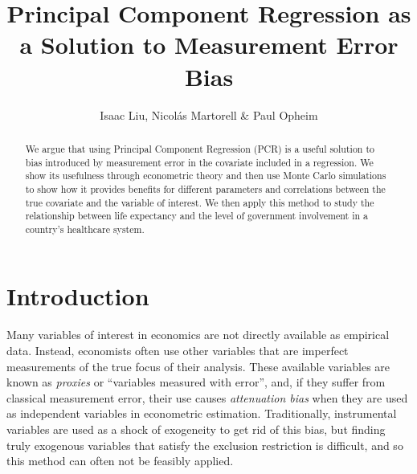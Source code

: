 \documentclass[10pt]{article}
\begin{document}
    \thispagestyle{firststyle}

    \author{Isaac Liu, Nicol\'as Martorell \& Paul Opheim}
    \title{Principal Component Regression as a Solution to Measurement Error Bias} 
    \maketitle



    \begin{abstract}

        We argue that using Principal Component Regression (PCR) is a useful solution to bias introduced by measurement error in the covariate included in a regression. We show its usefulness through econometric theory and then use Monte Carlo simulations to show how it provides benefits for different parameters and correlations between the true covariate and the variable of interest. We then apply this method to study the relationship between life expectancy and the level of government involvement in a country's healthcare system.
        
    \end{abstract}

    \newpage \clearpage

    \section*{Introduction}

        Many variables of interest in economics are not directly available as empirical data. Instead, economists often use other variables that are imperfect measurements of the true focus of their analysis. These available variables are known as \textit{proxies} or ``variables measured with error'', and, if they suffer from classical measurement error, their use causes \textit{attenuation bias} when they are used as independent variables in econometric estimation. Traditionally, instrumental variables are used as a shock of exogeneity to get rid of this bias, but finding truly exogenous variables that satisfy the exclusion restriction is difficult, and so this method can often not be feasibly applied.
\end{document}
